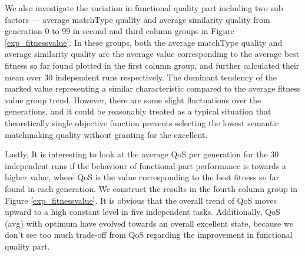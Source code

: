 \documentclass{llncs}
\begin{document}
We also investigate the variation in functional quality part including two sub factors --- average matchType quality and average similarity quality from generation 0 to 99 in second and third column groups in Figure \ref{exp_fitnessvalue}. In these groups,  both the average matchType quality and average similarity quality are the average value corresponding to the average best fitness so far found plotted in the first column group,  and further calculated their mean over 30 independent runs respectively. The dominant tendency of the marked value representing a similar characteristic compared to the average fitness value group trend. However, there are some slight fluctuations over the generations, and it could be reasonably treated as a typical situation that theoretically single objective function prevents selecting the lowest semantic matchmaking quality without granting for the excellent.

Lastly, It is interesting to look at the average QoS per generation for the 30 independent runs if the behaviour of functional part performance is towards a higher value, where QoS is the value corresponding to the best fitness so far found in each generation. We construct the results in the fourth column group in Figure \ref{exp_fitnessvalue}. It is obvious that the overall trend of QoS moves upward to a high constant level in five independent tasks. Additionally, QoS (avg) with optimum have evolved towards an overall excellent state, because we don't see too much trade-off from QoS regarding the improvement in functional quality part. 
\end{document}
